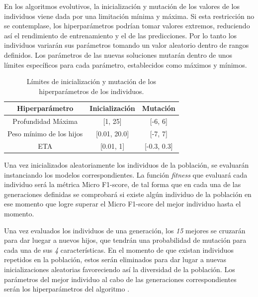         En los algoritmos evolutivos, la inicialización y mutación de los valores de los individuos viene dada por una limitación mínima y máxima. Si esta restricción no se contemplase, los hiperparámetros podrían tomar valores extremos, reduciendo así el rendimiento de entrenamiento y el de las predicciones. Por lo tanto los individuos variarán sus parámetros tomando un valor aleatorio dentro de rangos definidos. Los parámetros de las nuevas soluciones mutarán dentro de unos límites específicos para cada parámetro, establecidos como máximos y mínimos.

        \begin{table}[H]
            \small
            \centering
                \begin{tabular}{ |c|c|c| } 
                \hline
                \textbf{Hiperparámetro} & \textbf{Inicialización} & \textbf{Mutación}\\
                \hline
                    Profundidad Máxima & [1, 25] & [-6, 6]\\ 
                    Peso mínimo de los hijos & [0.01, 20.0] & [-7, 7] \\ 
                    ETA & [0.01, 1] &  [-0.3, 0.3] \\ 
                \hline

                \end{tabular}

            \caption{Límites de inicialización y mutación de los hiperparámetros de los individuos.}
            \label{InitAndMutationLimitsHyperparamsTable}
        \end{table}

        Una vez inicializados aleatoriamente los individuos de la población, se evaluarán instanciando los modelos  correspondientes. La función \textit{fitness} que evaluará cada individuo será la métrica Micro F1-score, de tal forma que en cada una de las generaciones definidas se comprobará si existe algún individuo de la población en ese momento que logre superar el Micro F1-score del mejor individuo hasta el momento.

        Una vez evaluados los individuos de una generación, los \textit{15} mejores se cruzarán para dar luegar a nuevos hijos, que tendrán una probabilidad de mutación para cada una de sus \textit{4} características. En el momento de que existan individuos repetidos en la población, estos serán eliminados para dar lugar a nuevas inicializaciones aleatorias favoreciendo así la diversidad de la población. Los parámetros del mejor individuo al cabo de las generaciones correspondientes serán los hiperparámetros del algoritmo .


